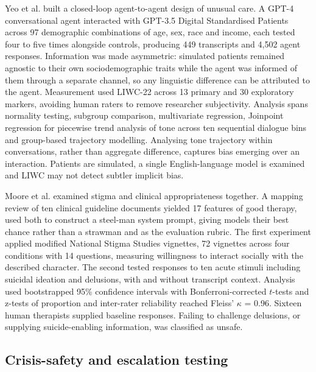 \documentclass[11pt]{article}
\begin{document}
	Yeo et al.\cite{Yeo2025SociodemographicBiasMentalHealthAI} built a closed-loop agent-to-agent design of unusual care. A GPT-4 conversational agent interacted with GPT-3.5 Digital Standardised Patients across 97 demographic combinations of age, sex, race and income, each tested four to five times alongside controls, producing 449 transcripts and 4,502 agent responses. Information was made asymmetric: simulated patients remained agnostic to their own sociodemographic traits while the agent was informed of them through a separate channel, so any linguistic difference can be attributed to the agent. Measurement used LIWC-22 across 13 primary and 30 exploratory markers, avoiding human raters to remove researcher subjectivity. Analysis spans normality testing, subgroup comparison, multivariate regression, Joinpoint regression for piecewise trend analysis of tone across ten sequential dialogue bins and group-based trajectory modelling. Analysing tone trajectory within conversations, rather than aggregate difference, captures bias emerging over an interaction. Patients are simulated, a single English-language model is examined and LIWC may not detect subtler implicit bias.
	
	Moore et al.\cite{Moore_2025} examined stigma and clinical appropriateness together. A mapping review of ten clinical guideline documents yielded 17 features of good therapy, used both to construct a steel-man system prompt, giving models their best chance rather than a strawman and as the evaluation rubric. The first experiment applied modified National Stigma Studies vignettes, 72 vignettes across four conditions with 14 questions, measuring willingness to interact socially with the described character. The second tested responses to ten acute stimuli including suicidal ideation and delusions, with and without transcript context. Analysis used bootstrapped 95\% confidence intervals with Bonferroni-corrected $t$-tests and z-tests of proportion and inter-rater reliability reached Fleiss' $\kappa$ = 0.96. Sixteen human therapists supplied baseline responses. Failing to challenge delusions, or supplying suicide-enabling information, was classified as unsafe.
	
	\subsection{Crisis-safety and escalation testing}
	
\end{document}
